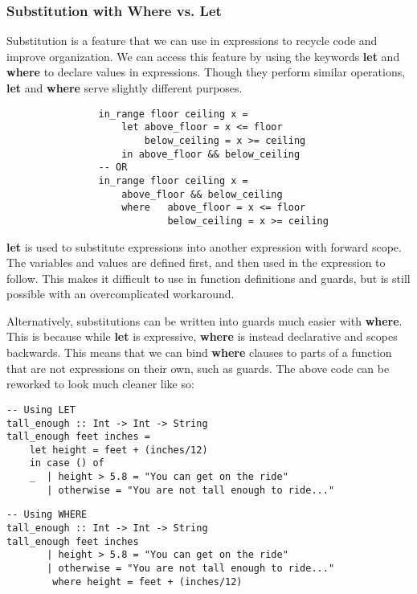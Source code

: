 \documentclass{article}
\begin{document}
        \subsubsection{Substitution with Where vs. Let}
            Substitution is a feature that we can use in expressions to recycle code and improve organization. We can access this feature by using the keywords \textbf{let} and \textbf{where} to declare values in expressions. Though they perform similar operations, \textbf{let} and \textbf{where} serve slightly different purposes.
            
            \begin{lstlisting}
                in_range floor ceiling x =
                    let above_floor = x <= floor
                        below_ceiling = x >= ceiling
                    in above_floor && below_ceiling
                -- OR
                in_range floor ceiling x =
                    above_floor && below_ceiling
                    where   above_floor = x <= floor
                            below_ceiling = x >= ceiling
            \end{lstlisting}
            
            \medskip\noindent
            \textbf{let} is used to substitute expressions into another expression with forward scope. The variables and values are defined first, and then used in the expression to follow. This makes it difficult to use in function definitions and guards, but is still possible with an overcomplicated workaround.

            \medskip\noindent
            Alternatively, substitutions can be written into guards much easier with \textbf{where}. This is because while \textbf{let} is expressive, \textbf{where} is instead declarative and scopes backwards. This means that we can bind \textbf{where} clauses to parts of a function that are not expressions on their own, such as guards. The above code can be reworked to look much cleaner like so:
            
            \begin{paracol}{2}
                \switchcolumn
                    \begin{lstlisting}
-- Using LET
tall_enough :: Int -> Int -> String
tall_enough feet inches =
    let height = feet + (inches/12)
    in case () of
    _  | height > 5.8 = "You can get on the ride"
       | otherwise = "You are not tall enough to ride..."
                    \end{lstlisting}
            
                \switchcolumn
                    \begin{lstlisting}
-- Using WHERE
tall_enough :: Int -> Int -> String
tall_enough feet inches
       | height > 5.8 = "You can get on the ride"
       | otherwise = "You are not tall enough to ride..."
        where height = feet + (inches/12)
                    \end{lstlisting}
            
            \end{paracol}
            
\end{document}
